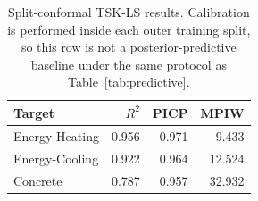 \begin{table}[htbp]
\centering
\caption{Split-conformal TSK-LS results. Calibration is performed inside each outer training split, so this row is not a posterior-predictive baseline under the same protocol as Table~\ref{tab:predictive}.}
\label{tab:conformal}
\scriptsize
\begin{tabular}{lrrr}
\toprule
Target & $R^2$ & PICP & MPIW \\
\midrule
Energy-Heating & 0.956 & 0.971 & 9.433 \\
Energy-Cooling & 0.922 & 0.964 & 12.524 \\
Concrete & 0.787 & 0.957 & 32.932 \\
\bottomrule
\end{tabular}
\end{table}
